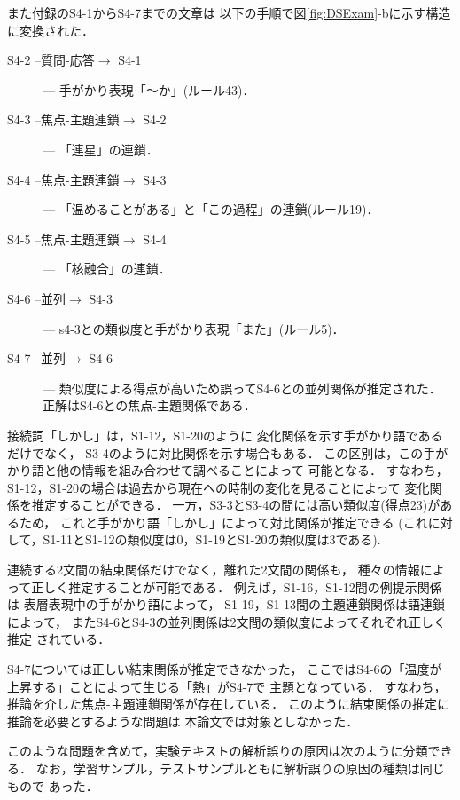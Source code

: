 また付録のS4-1からS4-7までの文章は
以下の手順で図\ref{fig:DSExam}-bに示す構造に変換された．
\begin{description}

\item[S4-2 --質問-応答$\rightarrow$ S4-1] --- 
手がかり表現「〜か」(ルール43)．

\item[S4-3 --焦点-主題連鎖$\rightarrow$ S4-2] --- 
「連星」の連鎖．

\item[S4-4 --焦点-主題連鎖$\rightarrow$ S4-3] --- 
「温めることがある」と「この過程」の連鎖(ルール19)．

\item[S4-5 --焦点-主題連鎖$\rightarrow$ S4-4] ---
「核融合」の連鎖．

\item[S4-6 --並列$\rightarrow$ S4-3] ---
s4-3との類似度と手がかり表現「また」(ルール5)．

\item[S4-7 --並列$\rightarrow$ S4-6] ---
類似度による得点が高いため誤ってS4-6との並列関係が推定された．
正解はS4-6との焦点-主題関係である．

\end{description}

接続詞「しかし」は，S1-12，S1-20のように
変化関係を示す手がかり語であるだけでなく，
S3-4のように対比関係を示す場合もある．
この区別は，この手がかり語と他の情報を組み合わせて調べることによって
可能となる．
すなわち，S1-12，S1-20の場合は過去から現在への時制の変化を見ることによって
変化関係を推定することができる．
一方，S3-3とS3-4の間には高い類似度(得点23)があるため，
これと手がかり語「しかし」によって対比関係が推定できる
(これに対して，S1-11とS1-12の類似度は0，S1-19とS1-20の類似度は3である). 

連続する2文間の結束関係だけでなく，離れた2文間の関係も，
種々の情報によって正しく推定することが可能である．
例えば，S1-16，S1-12間の例提示関係は
表層表現中の手がかり語によって，
S1-19，S1-13間の主題連鎖関係は語連鎖によって，
またS4-6とS4-3の並列関係は2文間の類似度によってそれぞれ正しく推定
されている．

S4-7については正しい結束関係が推定できなかった，
ここではS4-6の「温度が上昇する」ことによって生じる「熱」がS4-7で
主題となっている．
すなわち，推論を介した焦点-主題連鎖関係が存在している．
このように結束関係の推定に推論を必要とするような問題は
本論文では対象としなかった．

このような問題を含めて，実験テキストの解析誤りの原因は次のように分類できる．
なお，学習サンプル，テストサンプルともに解析誤りの原因の種類は同じもので
あった．

